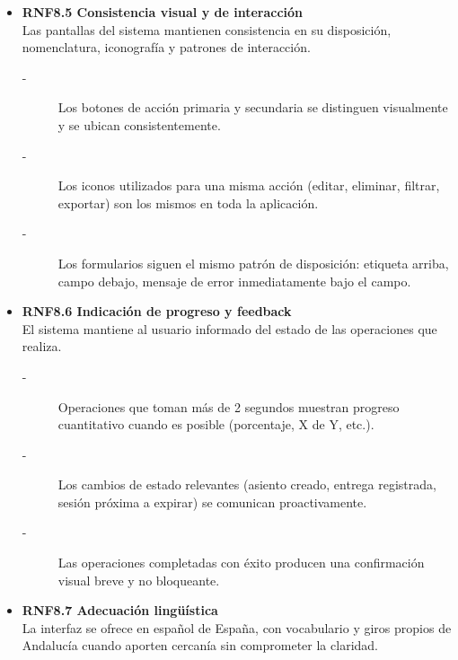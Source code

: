 \begin{itemize}
    \item \textbf{RNF8.5 Consistencia visual y de interacción} \\
    Las pantallas del sistema mantienen consistencia en su disposición,
    nomenclatura, iconografía y patrones de interacción.
    \begin{description}
        \item[-] Los botones de acción primaria y secundaria se distinguen
        visualmente y se ubican consistentemente. 
        \item[-] Los iconos utilizados para una misma acción (editar, eliminar,
        filtrar, exportar) son los mismos en toda la aplicación.
        \item[-] Los formularios siguen el mismo patrón de disposición:
        etiqueta arriba, campo debajo, mensaje de error inmediatamente
        bajo el campo.
    \end{description}


    \item \textbf{RNF8.6 Indicación de progreso y feedback} \\
    El sistema mantiene al usuario informado del estado de las
    operaciones que realiza.
    \begin{description}
        \item[-] Operaciones que toman más de 2 segundos muestran progreso
        cuantitativo cuando es posible (porcentaje, X de Y, etc.). 
        \item[-] Los cambios de estado relevantes (asiento creado, entrega
        registrada, sesión próxima a expirar) se comunican
        proactivamente.
        \item[-] Las operaciones completadas con éxito producen una confirmación
        visual breve y no bloqueante.
    \end{description}


    \item \textbf{RNF8.7 Adecuación lingüística} \\
    La interfaz se ofrece en español de España, con vocabulario y
    giros propios de Andalucía cuando aporten cercanía sin
    comprometer la claridad.
\end{itemize}



